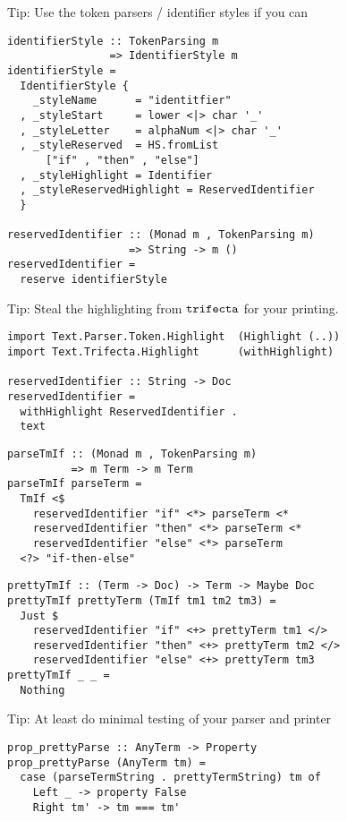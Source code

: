 \documentclass[aspectration=169]{beamer}
\begin{document}
\begin{frame}[fragile]
Tip: Use the token parsers / identifier styles if you can
  \begin{verbatim}
identifierStyle :: TokenParsing m
                => IdentifierStyle m
identifierStyle =
  IdentifierStyle {
    _styleName      = "identitfier"
  , _styleStart     = lower <|> char '_'
  , _styleLetter    = alphaNum <|> char '_'
  , _styleReserved  = HS.fromList 
      ["if" , "then" , "else"]
  , _styleHighlight = Identifier
  , _styleReservedHighlight = ReservedIdentifier
  }

reservedIdentifier :: (Monad m , TokenParsing m)
                   => String -> m ()
reservedIdentifier =
  reserve identifierStyle
  \end{verbatim}
\end{frame} 

\begin{frame}[fragile]
Tip: Steal the highlighting from $\tt{trifecta}$ for your printing.
  \begin{verbatim}
import Text.Parser.Token.Highlight  (Highlight (..))
import Text.Trifecta.Highlight      (withHighlight)

reservedIdentifier :: String -> Doc
reservedIdentifier =
  withHighlight ReservedIdentifier .
  text
  \end{verbatim}
\end{frame} 

\begin{frame}[fragile]
  \begin{verbatim}
parseTmIf :: (Monad m , TokenParsing m)
          => m Term -> m Term
parseTmIf parseTerm =
  TmIf <$
    reservedIdentifier "if" <*> parseTerm <*
    reservedIdentifier "then" <*> parseTerm <*
    reservedIdentifier "else" <*> parseTerm
  <?> "if-then-else"
  \end{verbatim}
\end{frame} 

\begin{frame}[fragile]
  \begin{verbatim}
prettyTmIf :: (Term -> Doc) -> Term -> Maybe Doc
prettyTmIf prettyTerm (TmIf tm1 tm2 tm3) =
  Just $
    reservedIdentifier "if" <+> prettyTerm tm1 </>
    reservedIdentifier "then" <+> prettyTerm tm2 </>
    reservedIdentifier "else" <+> prettyTerm tm3
prettyTmIf _ _ =
  Nothing
  \end{verbatim}
\end{frame} 

\begin{frame}[fragile]
Tip: At least do minimal testing of your parser and printer
  \begin{verbatim}
prop_prettyParse :: AnyTerm -> Property
prop_prettyParse (AnyTerm tm) =
  case (parseTermString . prettyTermString) tm of
    Left _ -> property False
    Right tm' -> tm === tm'
  \end{verbatim}
\end{frame} 
\end{document}
